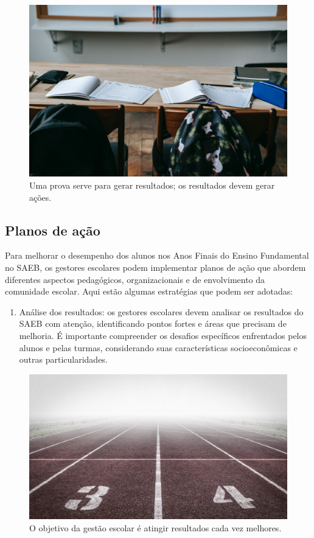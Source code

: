 \begin{figure}[t]
\centering
\includegraphics[width=\textwidth]{./imgs/Imagem005.jpg}
\caption{Uma prova serve para gerar resultados; os resultados devem
gerar ações.}
\end{figure}

\subsection{Planos de ação}\label{planos-de-auxe7uxe3o}

Para melhorar o desempenho dos alunos nos Anos Finais do Ensino
Fundamental no SAEB, os gestores escolares podem implementar planos de
ação que abordem diferentes aspectos pedagógicos, organizacionais e de
envolvimento da comunidade escolar. Aqui estão algumas estratégias que
podem ser adotadas:

\begin{enumerate}
\def\labelenumi{\arabic{enumi}.}
\tightlist
\item
  Análise dos resultados: os gestores escolares devem analisar os
  resultados do SAEB com atenção, identificando pontos fortes e áreas
  que precisam de melhoria. É importante compreender os desafios
  específicos enfrentados pelos alunos e pelas turmas, considerando suas
  características socioeconômicas e outras particularidades.
\end{enumerate}

\begin{figure}[t]
\centering
\includegraphics[width=\textwidth]{./imgs/Imagem006.jpg}
\caption{O objetivo da gestão escolar é atingir resultados cada vez
melhores.}
\end{figure}

